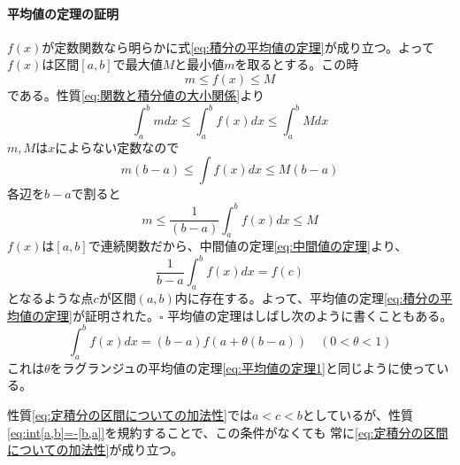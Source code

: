 \documentclass[a4j,dvipdfmx]{jsarticle}
\begin{document}
                \paragraph{平均値の定理の証明}
                    $f(x)$が定数関数なら明らかに式\eqref{eq:積分の平均値の定理}が成り立つ。よって$f(x)$は区間$[a,b]$で最大値$M$と最小値$m$を取るとする。この時
                    \begin{equation*}
                        m\leq f(x) \leq M
                    \end{equation*}
                    である。性質\eqref{eq:関数と積分値の大小関係}より
                    \begin{equation*}
                        \int_a^b mdx \leq \int_a^b f(x)dx \leq \int_a^b Mdx
                    \end{equation*}
                    $m,M$は$x$によらない定数なので
                    \begin{equation*}
                        m(b-a) \leq \int f(x)dx \leq M(b-a)
                    \end{equation*}
                    各辺を$b-a$で割ると
                    \begin{equation*}
                        m \leq \frac{1}{(b-a)}\int_a^b f(x)dx \leq M
                    \end{equation*}
                    $f(x)$は$[a,b]$で連続関数だから、中間値の定理\eqref{eq:中間値の定理}より、
                    \begin{equation*}
                        \frac{1}{b-a}\int_a^b f(x)dx = f(c)
                    \end{equation*}
                    となるような点$c$が区間$(a,b)$内に存在する。よって、平均値の定理\eqref{eq:積分の平均値の定理}が証明された。$\square$
                \clearpage
                平均値の定理はしばし次のように書くこともある。
                \begin{equation}
                    \int_{a}^{b}f(x)dx = (b-a)f(a+\theta(b-a))\quad (0<\theta < 1) \label{eq:積分の平均値の定理θ}
                \end{equation}
                これは$\theta$をラグランジュの平均値の定理\eqref{eq:平均値の定理1}と同じように使っている。

                性質\eqref{eq:定積分の区間についての加法性}では$a<c<b$としているが、性質\eqref{eq:int[a,b]=-[b,a]}を規約することで、この条件がなくても
                常に\eqref{eq:定積分の区間についての加法性}が成り立つ。

                \hrulefill
\end{document}

